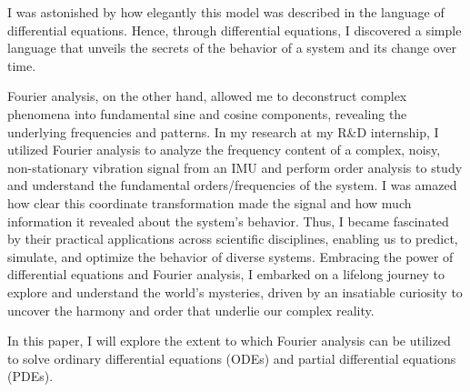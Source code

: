 \noindent
I was astonished by how elegantly this model was described in the language of differential equations.
Hence, through differential equations, I discovered a simple language that unveils the secrets of the behavior of a system and its change over time. 

Fourier analysis, on the other hand, allowed me to deconstruct complex phenomena into fundamental sine and cosine components, revealing the underlying frequencies and patterns. 
In my research at my R\&D internship, I utilized Fourier analysis to analyze the frequency content of a complex, noisy, non-stationary vibration signal from an IMU and perform order analysis to study and understand the fundamental orders/frequencies of the system.
I was amazed how clear this coordinate transformation made the signal and how much information it revealed about the system's behavior.
Thus, I became fascinated by their practical applications across scientific disciplines, enabling us to predict, simulate, and optimize the behavior of diverse systems. 
Embracing the power of differential equations and Fourier analysis, I embarked on a lifelong journey to explore and understand the world's mysteries, driven by an insatiable curiosity to uncover the harmony and order that underlie our complex reality.

In this paper, I will explore the extent to which Fourier analysis can be utilized to solve ordinary differential equations (ODEs) and partial differential equations (PDEs).


